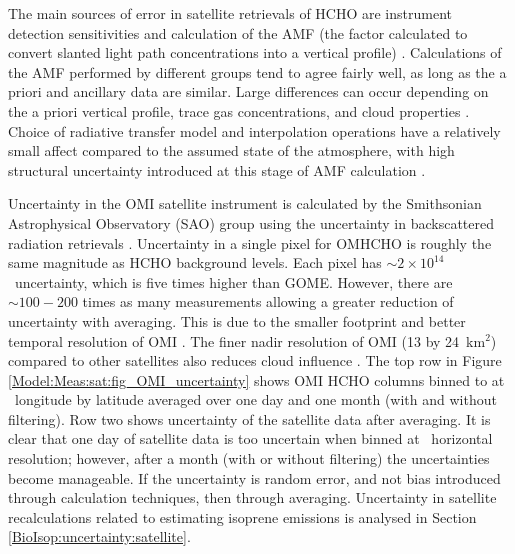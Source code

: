    The main sources of error in satellite retrievals of HCHO are instrument detection sensitivities and calculation of the AMF (the factor calculated to convert slanted light path concentrations into a vertical profile) \parencite{Millet2006}.
    Calculations of the AMF performed by different groups tend to agree fairly well, as long as the a priori and ancillary data are similar.
    Large differences can occur depending on the a priori vertical profile, trace gas concentrations, and cloud properties \parencite{Lorente2017}.
    Choice of radiative transfer model and interpolation operations have a relatively small affect compared to the assumed state of the atmosphere, with high structural uncertainty introduced at this stage of AMF calculation \parencite{Lorente2017}.
    
    Uncertainty in the OMI satellite instrument is calculated by the Smithsonian Astrophysical Observatory (SAO) group using the uncertainty in backscattered radiation retrievals \parencite{Abad2015, Abad2016}.
    Uncertainty in a single pixel for OMHCHO is roughly the same magnitude as HCHO background levels.
    Each pixel has $\sim 2 \times 10^{14}$\moleccm ~uncertainty, which is five times higher than GOME.
    However, there are $\sim 100-200 $ times as many measurements allowing a greater reduction of uncertainty with averaging.
    This is due to the smaller footprint and better temporal resolution of OMI \parencite{Chance2002,Millet2008}.
    The finer nadir resolution of OMI (13 by 24~km${^2}$) compared to other satellites also reduces cloud influence \parencite{Millet2006, Millet2008}.
    The top row in Figure \ref{Model:Meas:sat:fig_OMI_uncertainty} shows OMI HCHO columns binned to at \highhr ~longitude by latitude averaged over one day and one month (with and without filtering).
    Row two shows uncertainty of the satellite data after averaging.
    It is clear that one day of satellite data is too uncertain when binned at \highhr ~horizontal resolution; however, after a month (with or without filtering) the uncertainties become manageable.
    If the uncertainty is random error, and not bias introduced through calculation techniques, then  through averaging.
    Uncertainty in satellite recalculations related to estimating isoprene emissions is analysed in Section \ref{BioIsop:uncertainty:satellite}.
    
